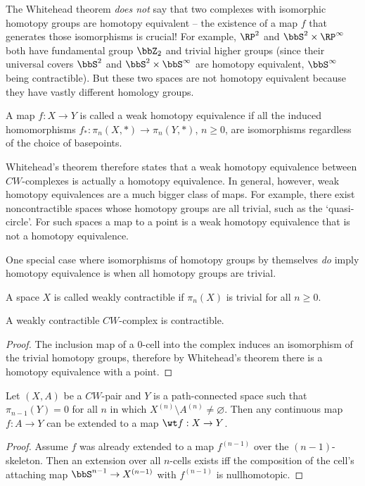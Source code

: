 \begin{rem}
    The Whitehead theorem \emph{does not} say that two complexes with isomorphic homotopy groups are homotopy equivalent -- the existence of a map $f$ that generates those isomorphisms is crucial! For example, $\RP^2$ and $\bbS^2\times \RP^\infty$ both have fundamental group $\bbZ_2$ and trivial higher groups (since their universal covers $\bbS^2$ and $\bbS^2\times \bbS^\infty$ are homotopy equivalent,  $\bbS^\infty$ being contractible). But these two spaces are not homotopy equivalent because they have vastly different homology groups.
\end{rem}

\begin{defn}\label{Homotopy equivalence!Weak}
    A map $f:X\to Y$ is called a weak homotopy equivalence if all the induced homomorphisms $f_\ast:\pi_n(X,*)\to \pi_n(Y,*)$, $n\geq 0$, are isomorphisms regardless of the choice of basepoints.
\end{defn}


Whitehead's theorem therefore states that a weak homotopy equivalence between $CW$-complexes is actually a homotopy equivalence.  In general, however, weak homotopy equivalences are a much bigger class of maps. For example, there exist noncontractible spaces whose homotopy groups are all trivial, such as the `quasi-circle'. For such spaces a map to a point is a weak homotopy equivalence that is not a homotopy equivalence. 

One special case where isomorphisms of homotopy groups by themselves \emph{do} imply homotopy equivalence is when all homotopy groups are trivial.

\begin{defn}
    A space $X$ is called weakly contractible if $\pi_n(X)$ is trivial for all $n\geq 0$.
\end{defn}

\begin{cor}
    A weakly contractible $CW$-complex is contractible.
\end{cor}
\begin{proof}
    The inclusion map of a $0$-cell into the complex induces an isomorphism of the trivial homotopy groups, therefore by Whitehead's theorem there is a homotopy equivalence with a point.
\end{proof}

\begin{lem}\label{lem 4.7 Hatcher}
    Let $(X,A)$ be a $CW$-pair and $Y$ is a path-connected space such that $\pi_{n-1}(Y)=0$ for all $n$ in which $X^{(n)}\setminus A^{(n)}\neq \varnothing$. Then any continuous map $f:A\to Y$ can be extended to a map $\wt f:X\to Y$.
\end{lem}
\begin{proof}
    Assume $f$ was already extended to a map $f^{(n-1)}$ over the $(n-1)$-skeleton. Then an extension over all $n$-cells exists iff the composition of the cell's attaching map $\bbS^{n-1}\to X^{(n-1)}$ with $f^{(n-1)}$ is nullhomotopic.
\end{proof}





